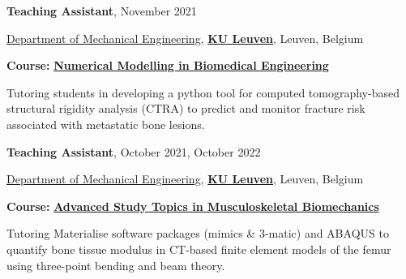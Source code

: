 \documentclass[8pt]{article}
\newcommand{\halfblankline}{\quad\vspace{-0.5\baselineskip}\pagebreak[3]}
\begin{document}
\halfblankline


\textbf{Teaching Assistant}, {November 2021}
\begin{innerlist}
	\item[] \href{https://www.mech.kuleuven.be/en}{Department of Mechanical Engineering}, \href{https://www.kuleuven.be/english/kuleuven}{\textbf{KU Leuven}}, Leuven, Belgium
	\begin{innerlist}
		\item[] \textbf{Course:} \href{https://onderwijsaanbod.kuleuven.be//syllabi/e/H0N44AE.htm#activetab=doelstellingen_idp65744} {\textbf{Numerical Modelling in Biomedical Engineering}}
    \begin{innerlist}
      	  \item   Tutoring students in developing a python tool for computed tomography-based structural rigidity analysis (CTRA) to predict and monitor fracture risk associated with metastatic bone lesions. 
 
    \end{innerlist}

		
	\end{innerlist}
\end{innerlist}

\halfblankline



\textbf{Teaching Assistant}, {October 2021, October 2022}
\begin{innerlist}
	\item[] \href{https://www.mech.kuleuven.be/en}{Department of Mechanical Engineering}, \href{https://www.kuleuven.be/english/kuleuven}{\textbf{KU Leuven}}, Leuven, Belgium
	\begin{innerlist}
		\item[] \textbf{Course:} \href{https://onderwijsaanbod.kuleuven.be//syllabi/e/H06X2AE.htm#activetab=doelstellingen_idp59688} {\textbf{Advanced Study Topics in Musculoskeletal Biomechanics}}
    \begin{innerlist}
      	  \item   Tutoring Materialise software packages (mimics \& 3-matic) and ABAQUS to quantify bone tissue modulus in CT-based finite element models of the femur using three-point bending and beam theory. 
 
    \end{innerlist}
	
	\end{innerlist}
\end{innerlist}

\halfblankline
\end{document}
